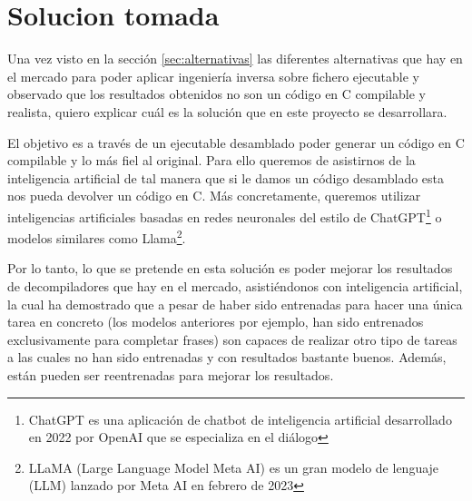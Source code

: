 \section{Solucion tomada}
\label{sec:solucion}


Una vez visto en la sección \ref{sec:alternativas} las diferentes alternativas que hay
en el mercado para poder aplicar ingeniería inversa sobre fichero ejecutable y observado
que los resultados obtenidos no son un código en C compilable y realista, quiero explicar
cuál es la solución que en este proyecto se desarrollara.

El objetivo es a través de un ejecutable desamblado poder generar un código en C compilable
y lo más fiel al original. Para ello queremos de asistirnos de la inteligencia artificial
de tal manera que si le damos un código desamblado esta nos pueda devolver un código en C.
Más concretamente, queremos utilizar inteligencias artificiales basadas en redes neuronales
del estilo de ChatGPT\footnote{ChatGPT es una aplicación de chatbot de inteligencia artificial
desarrollado en 2022 por OpenAI que se especializa en el diálogo} o modelos similares como 
Llama\footnote{LLaMA (Large Language Model Meta AI) es un gran modelo de lenguaje (LLM) 
lanzado por Meta AI en febrero de 2023}.

Por lo tanto, lo que se pretende en esta solución es poder mejorar los resultados de decompiladores
que hay en el mercado, asistiéndonos con inteligencia artificial, la cual ha demostrado
que a pesar de haber sido entrenadas para hacer una única tarea en concreto (los modelos anteriores
por ejemplo, han sido entrenados exclusivamente para completar frases) son capaces de
realizar otro tipo de tareas a las cuales no han sido entrenadas y con resultados bastante buenos.
Además, están pueden ser reentrenadas para mejorar los resultados.

